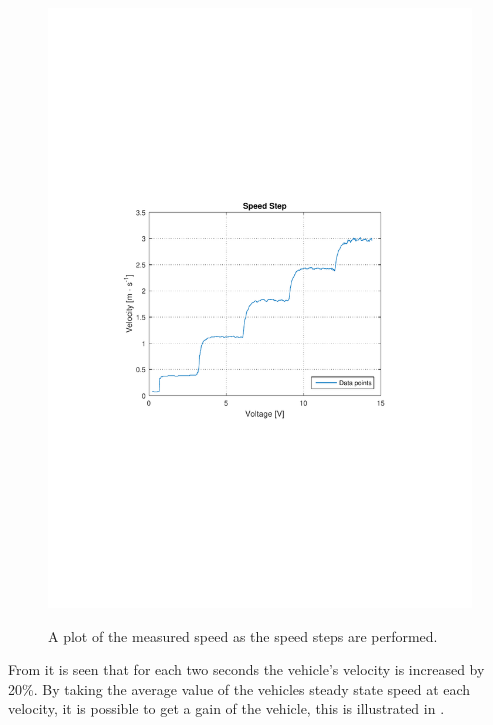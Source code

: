 \begin{figure}[H]
  \centering
  {
    \includegraphics[width=1.4\textwidth]{figures/SpeedStep.pdf}
  }
  \caption{A plot of the measured speed as the speed steps are performed.}
  \label{SpeedStepGainTest}
\end{figure}\vspace{-5mm}

From  it is seen that for each two seconds the vehicle's velocity is increased by 20\%. By taking the average value of the vehicles steady state speed at each velocity, it is possible to get a gain of the vehicle, this is illustrated in .

